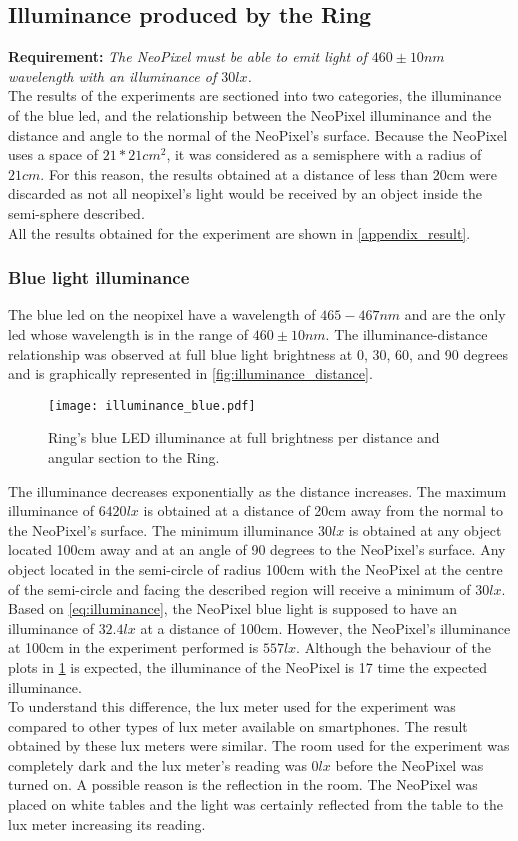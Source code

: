 \subsection{Illuminance produced by the Ring}
\textbf{Requirement:}  \textit{The NeoPixel must be able to emit light of $460\pm 10 nm$ wavelength with an illuminance of $30lx$.}\\
The results of the experiments are sectioned into two categories, the illuminance of the blue led, and the relationship between the NeoPixel illuminance and the distance and angle to the normal of the NeoPixel's surface. Because the NeoPixel uses a space of $21*21cm^2$, it was considered as a semisphere with a radius of $21cm$. For this reason, the results obtained at a distance of less than 20cm were discarded as not all neopixel's light would be received by an object inside the semi-sphere described.\\
All the results obtained for the experiment are shown in \cref{appendix_result}.

\subsubsection{Blue light illuminance}\label{illuminance_blue}
The blue led on the neopixel have a wavelength of $465-467nm$ and are the only led whose wavelength is in the range of $460\pm 10 nm$. The illuminance-distance relationship was observed at full blue light brightness at 0, 30, 60, and 90 degrees and is graphically represented in \cref{fig:illuminance_distance}. 
\begin{figure}[ht]
	\centering
	\texttt{[image: illuminance\_blue.pdf]}
	\caption{Ring's blue LED illuminance at full brightness per distance and angular section to the Ring.}
	\label{fig:illuminance_blue}
\end{figure}
The illuminance decreases exponentially as the distance increases. The maximum illuminance of $6420lx$ is obtained at a distance of 20cm away from the normal to the NeoPixel's surface. The minimum illuminance $30lx$ is obtained at any object located 100cm away and at an angle of 90 degrees to the NeoPixel's surface. Any object located in the semi-circle of radius 100cm with the NeoPixel at the centre of the semi-circle and facing the described region will receive a minimum of $30lx$. \\
Based on \cref{eq:illuminance}, the NeoPixel blue light is supposed to have an illuminance of $32.4lx$ at a distance of 100cm. However, the NeoPixel's illuminance at 100cm in the experiment performed is $557lx$. Although the behaviour of the plots in \cref{fig:illuminance_blue} is expected, the illuminance of the NeoPixel is 17 time the expected illuminance. \\
To understand this difference, the lux meter used for the experiment was compared to other types of lux meter available on smartphones. The result obtained by these lux meters were similar. The room used for the experiment was completely dark and the lux meter's reading was $0lx$ before the NeoPixel was turned on. A possible reason is the reflection in the room. The NeoPixel was placed on white tables and the light was certainly reflected from the table to the lux meter increasing its reading.    

